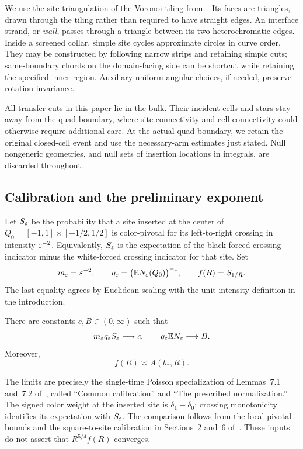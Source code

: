 We use the site triangulation of the Voronoi tiling from~\cite{V}.
Its faces are triangles, drawn through the tiling rather than required
to have straight edges. An interface strand, or \emph{wall}, passes
through a triangle between its two heterochromatic edges. Inside a
screened collar, simple site cycles approximate circles in curve
order. They may be constructed by following narrow strips and
retaining simple cuts; same-boundary chords on the domain-facing side
can be shortcut while retaining the specified inner region. Auxiliary
uniform angular choices, if needed, preserve rotation invariance.

All transfer cuts in this paper lie in the bulk. Their incident cells
and stars stay away from the quad boundary, where site connectivity
and cell connectivity could otherwise require additional care.
At the actual quad boundary, we retain the original closed-cell event
and use the necessary-arm estimates just stated. Null nongeneric
geometries, and null sets of insertion locations in integrals, are
discarded throughout.

\subsection{Calibration and the preliminary exponent}
Let $S_\varepsilon$ be the probability that a site inserted at the center of
$Q_0=[-1,1]\times[-1/2,1/2]$ is color-pivotal for its left-to-right
crossing in intensity $\varepsilon^{-2}$. Equivalently, $S_\varepsilon$ is the
expectation of the black-forced crossing indicator minus the
white-forced crossing indicator for that site. Set
\[
 m_\varepsilon=\varepsilon^{-2},\qquad
 q_\varepsilon=\bigl(\mathbb E N_\varepsilon(Q_0)\bigr)^{-1},\qquad
 f(R)=S_{1/R}.
\]
The last equality agrees by Euclidean scaling with the unit-intensity
definition in the introduction.

\begin{proposition}[Calibration]\label{in:calibration}
There are constants $c,B\in(0,\infty)$ such that
\begin{equation}\label{in:calibration-eq}
 m_\varepsilon q_\varepsilon S_\varepsilon\longrightarrow c,
 \qquad q_\varepsilon\mathbb E N_\varepsilon\longrightarrow B.
\end{equation}
Moreover,
\begin{equation}\label{in:comparison}
 f(R)\asymp A(b_*,R).
\end{equation}
\end{proposition}

The limits are precisely the single-time Poisson specialization of
Lemmas~7.1 and~7.2 of~\cite{V}, called ``Common calibration'' and
``The prescribed normalization.'' The signed color weight at the
inserted site is $\delta_1-\delta_0$; crossing monotonicity identifies
its expectation with $S_\varepsilon$. The comparison follows from the local
pivotal bounds and the square-to-site calibration in Sections~2 and~6
of~\cite{V}. These inputs do not assert that
$R^{5/4}f(R)$ converges.


